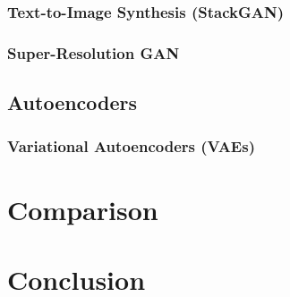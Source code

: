 \documentclass[conference]{IEEEtran}
\begin{document}
\subsubsection{Text-to-Image Synthesis (StackGAN)}

\subsubsection{Super-Resolution GAN}

\subsection{Autoencoders}

\subsubsection{Variational Autoencoders (VAEs)}

\section{Comparison}
\label{comparison}

\section{Conclusion}
\label{conclusion}
\end{document}

